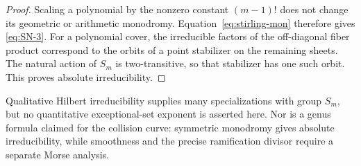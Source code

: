 \begin{proof}
Scaling a polynomial by the nonzero constant \((m-1)!\) does not change its
geometric or arithmetic monodromy.  Equation~\eqref{eq:stirling-mon} therefore
gives \eqref{eq:SN-3}.  For a polynomial cover, the irreducible factors of the
off-diagonal fiber product correspond to the orbits of a point stabilizer on
the remaining sheets.  The natural action of \(S_m\) is two-transitive, so
that stabilizer has one such orbit.  This proves absolute irreducibility.
\end{proof}

\begin{remark}
Qualitative Hilbert irreducibility supplies many specializations with group
\(S_m\), but no quantitative exceptional-set exponent is asserted here.
Nor is a genus formula claimed for the collision curve: symmetric
monodromy gives absolute irreducibility, while smoothness and the precise
ramification divisor require a separate Morse analysis.
\end{remark}
